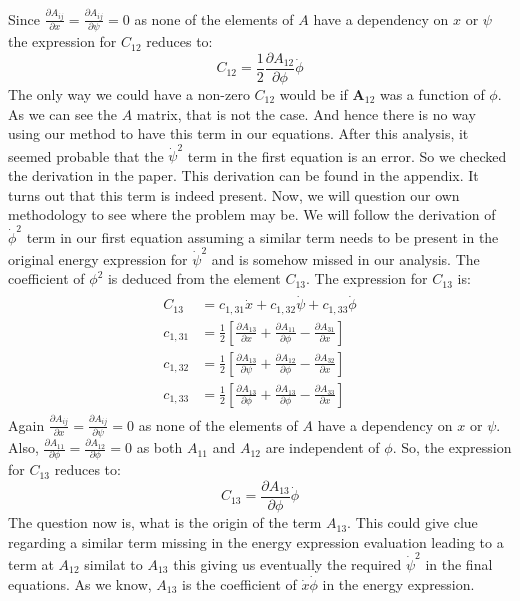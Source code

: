 \documentclass[a4paper,10pt]{article}
\begin{document}
\begin{itemize}
Since $\frac{\partial A_{ij}}{\partial x} = \frac{\partial A_{ij}}{\partial \psi} = 0$ as none of the elements of $A$ have a dependency on $x$ or $\psi$
the expression for $C_{12}$ reduces to:
\[
 C_{12} = \frac{1}{2}\frac{\partial A_{12}}{\partial \phi}\dot{\phi}
\]
The only way we could have a non-zero $C_{12}$ would be if $\mathbf{A}_{12}$ was a function of $\phi$. As we can see the $A$ matrix, 
that is not the case. And hence there is no way using our method to have this term in our equations.
After this analysis, it seemed probable that the $\dot\psi^2$ term in the first equation is an error. So we checked the derivation
in the paper. This derivation can be found in the appendix. It turns out that this term is indeed present.
Now, we will question our own methodology to see where the problem may be. We will follow the derivation of $\dot\phi^2$ term in our
first equation assuming a similar term needs to be present in the original energy expression for $\dot\psi^2$ and is somehow missed
in our analysis.
The coefficient of $\phi^2$ is deduced from the element $C_{13}$. The expression for $C_{13}$ is:
\begin{align}
\begin{split}
 C_{13} &= c_{1,31}\dot{x} + c_{1,32}\dot{\psi} + c_{1,33}\dot{\phi} \\
 c_{1,31} &= \frac{1}{2}\left[\frac{\partial A_{13}}{\partial x} + \frac{\partial A_{11}}{\partial \phi} - \frac{\partial A_{31}}{\partial x}\right] \\
 c_{1,32} &= \frac{1}{2}\left[\frac{\partial A_{13}}{\partial \psi} + \frac{\partial A_{12}}{\partial \phi} - \frac{\partial A_{32}}{\partial x}\right] \\
 c_{1,33} &= \frac{1}{2}\left[\frac{\partial A_{13}}{\partial \phi} + \frac{\partial A_{13}}{\partial \phi} - \frac{\partial A_{33}}{\partial x}\right]
\end{split}
\end{align}
Again $\frac{\partial A_{ij}}{\partial x} = \frac{\partial A_{ij}}{\partial \psi} = 0$ as none of the elements of $A$ have a dependency on $x$ or $\psi$.
Also, $\frac{\partial A_{11}}{\partial \phi} = \frac{\partial A_{12}}{\partial \phi} = 0$ as both $A_{11}$ and $A_{12}$ are independent of $\phi$. So,
the expression for $C_{13}$ reduces to:
\[
 C_{13} = \frac{\partial A_{13}}{\partial \phi}\dot{\phi}
\]
The question now is, what is the origin of the term $A_{13}$. This could give clue regarding a similar term missing in the energy expression evaluation
leading to a term at $A_{12}$ similat to $A_{13}$ this giving us eventually the required $\dot\psi^2$ in the final equations.
As we know, $A_{13}$ is the coefficient of $\dot{x}\dot\phi$ in the energy expression.



\end{itemize}
\end{document}

